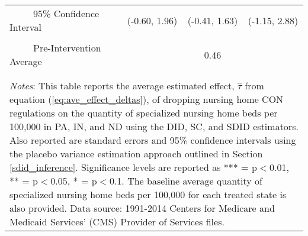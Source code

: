 \documentclass[../Main.tex]{subfiles}
\begin{document}
\begin{table}[htbp]
\begin{tabular}{l*{3}{c}}
\\[-2ex]
\multicolumn{1}{l}{\ \ \ \ \ 95\% Confidence Interval}&   \multicolumn{1}{c}{(-0.60, 1.96)}&   \multicolumn{1}{c}{(-0.41, 1.63)}&   \multicolumn{1}{c}{(-1.15, 2.88)}\\
\\[-2ex]
\multicolumn{1}{l}{\ \ \ \ \ Pre-Intervention Average}&   \multicolumn{3}{c}{0.46}\\
\\[-.1ex]
\hline\hline
\\[-2ex]
\multicolumn{4}{p{.75\linewidth}}{\footnotesize \textit{Notes}: This table reports the average estimated effect, $\hat{\tau}$ from equation (\ref{eq:ave_effect_deltas}), of dropping nursing home CON regulations on the quantity of specialized nursing home beds per 100,000 in PA, IN, and ND using the DID, SC, and SDID estimators. Also reported are standard errors and 95\% confidence intervals using the placebo variance estimation approach outlined in Section \ref{sdid_inference}. Significance levels are reported as *** = p$<$0.01, ** = p$<$0.05, * = p$<$0.1. The baseline average quantity of specialized nursing home beds per 100,000 for each treated state is also provided. Data source: 1991-2014 Centers for Medicare and Medicaid Services’ (CMS) Provider of Services files.}
\end{tabular}
\end{table}
\vfill
\clearpage
\end{document}
